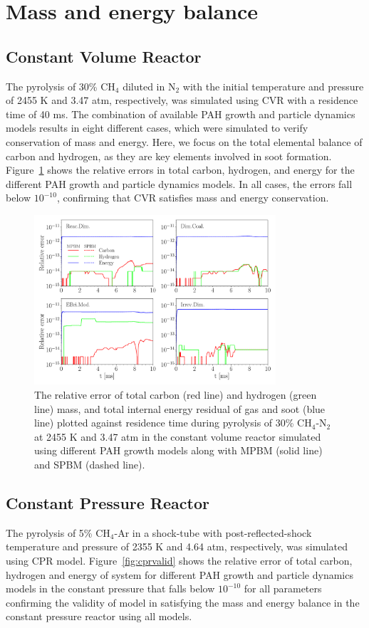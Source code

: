 \section{Mass and energy balance}

\subsection{Constant Volume Reactor}
The pyrolysis of 30\% $\mathrm{CH_4}$ diluted in $\mathrm{N_2}$ with the initial temperature and pressure of 2455 K and 3.47 atm, respectively, was simulated using CVR with a residence time of 40 ms. The combination of available PAH growth and particle dynamics models results in eight different cases, which were simulated to verify conservation of mass and energy. Here, we focus on the total elemental balance of carbon and hydrogen, as they are key elements involved in soot formation.
Figure~\ref{fig:constuvvalid} shows the relative errors in total carbon, hydrogen, and energy for the different PAH growth and particle dynamics models. In all cases, the errors fall below $\mathrm{10^{-10}}$, confirming that CVR satisfies mass and energy conservation.
\begin{figure}[H]
	\centering
	\includegraphics[width=0.8\textwidth]{Figures/Results/Validation/ConstUV/relerr_constuv.pdf}
	\caption{The relative error of total carbon (red line) and hydrogen (green line) mass, and total internal energy residual of gas and soot (blue line) plotted against residence time during pyrolysis of 30\% $\mathrm{CH_4}$-$\mathrm{N_2}$ at 2455 K and 3.47 atm in the constant volume reactor simulated using different PAH growth models along with MPBM (solid line) and SPBM (dashed line).}
	\label{fig:constuvvalid}
\end{figure}


\subsection{Constant Pressure Reactor}
The pyrolysis of 5\% $\mathrm{CH_4}$-Ar in a shock-tube with post-reflected-shock temperature and pressure of 2355 K and 4.64 atm, respectively, was simulated using CPR model. Figure~\ref{fig:cprvalid} shows the relative error of total carbon, hydrogen and energy of system for different PAH growth and particle dynamics models in the constant pressure that falls below $\mathrm{10^{-10}}$ for all parameters confirming the validity of model in satisfying the mass and energy balance in the constant pressure reactor using all models.


